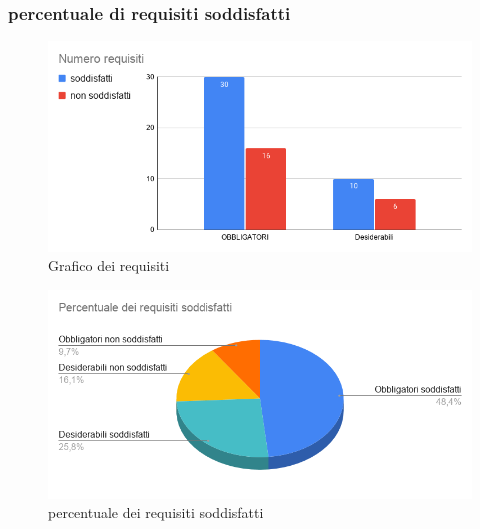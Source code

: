 \subsubsection{percentuale di requisiti soddisfatti}

    \begin{figure}[H]
        \centering
        \includegraphics[width=15 cm]{source/sections/images/num-requisiti.png}
        \caption{Grafico dei requisiti}
    \end{figure}

    \begin{figure}[H]
        \centering
        \includegraphics[width=15 cm]{source/sections/images/percentuale-requisiti.png}
        \caption{percentuale dei requisiti soddisfatti}
    \end{figure}

